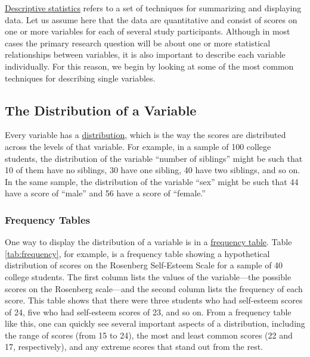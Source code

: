 \documentclass[
]{krantz}
\begin{document}
\protect\hyperlink{descriptive-statistics-1}{Descriptive statistics} refers to a set of techniques for summarizing and displaying data. Let us assume here that the data are quantitative and consist of scores on one or more variables for each of several study participants. Although in most cases the primary research question will be about one or more statistical relationships between variables, it is also important to describe each variable individually. For this reason, we begin by looking at some of the most common techniques for describing single variables.

\hypertarget{the-distribution-of-a-variable}{%
\subsection*{The Distribution of a Variable}\label{the-distribution-of-a-variable}}


Every variable has a \protect\hyperlink{distribution}{distribution}, which is the way the scores are distributed across the levels of that variable. For example, in a sample of 100 college students, the distribution of the variable ``number of siblings'' might be such that 10 of them have no siblings, 30 have one sibling, 40 have two siblings, and so on. In the same sample, the distribution of the variable ``sex'' might be such that 44 have a score of ``male'' and 56 have a score of ``female.''

\hypertarget{frequency-tables}{%
\subsubsection*{Frequency Tables}\label{frequency-tables}}


One way to display the distribution of a variable is in a \protect\hyperlink{frequency-table}{frequency table}. Table \ref{tab:frequency}, for example, is a frequency table showing a hypothetical distribution of scores on the Rosenberg Self-Esteem Scale for a sample of 40 college students. The first column lists the values of the variable---the possible scores on the Rosenberg scale---and the second column lists the frequency of each score. This table shows that there were three students who had self-esteem scores of 24, five who had self-esteem scores of 23, and so on. From a frequency table like this, one can quickly see several important aspects of a distribution, including the range of scores (from 15 to 24), the most and least common scores (22 and 17, respectively), and any extreme scores that stand out from the rest.
\end{document}
